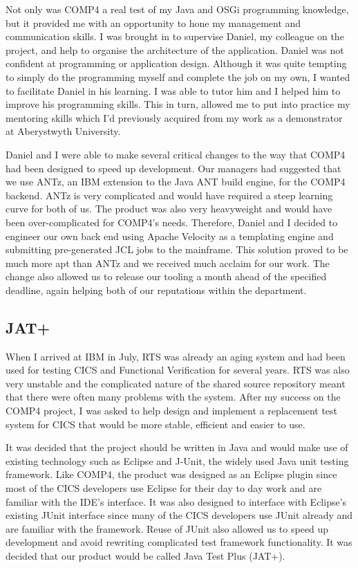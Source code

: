 \documentclass[12pt,a4paper]{article}
\begin{document}
Not only was COMP4 a real test of my Java and OSGi programming knowledge, but it
provided me with an opportunity to hone my management and communication skills.
I was brought in to supervise Daniel, my colleague on the project, and help to
organise the architecture of the application. Daniel was not confident at
programming or application design. Although it was quite tempting to simply do
the programming myself and complete the job on my own, I wanted to facilitate 
Daniel in his learning. I was able to tutor him and I
helped him to improve his programming skills. This in turn, allowed me to put into
practice my mentoring skills which I'd previously acquired from my work as a
demonstrator at Aberystwyth University.

Daniel and I were able to make several critical changes to the way that COMP4
had been designed to speed up development. Our managers had suggested that we
use ANTz, an IBM extension to the Java ANT build engine, for the COMP4 backend.
ANTz is very complicated and would have required a steep learning curve for both
of us. The product was also very heavyweight and would have been over-complicated
for COMP4's needs. Therefore, Daniel and I decided to engineer our own back end
using Apache Velocity as a templating engine and submitting pre-generated JCL
jobs to the mainframe. This solution proved to be much more apt than ANTz and we
received much acclaim for our work. The change also allowed us to release our
tooling a month ahead of the specified deadline, again helping both of our
reputations within the department.

\subsection{JAT+}
\label{sec:jatp}
When I arrived at IBM in July, RTS was already an aging system and had been used
for testing CICS and Functional Verification for several years. RTS was also
very unstable and the complicated nature of the shared source repository meant
that there were often many problems with the system. After my success on the
COMP4 project, I was asked to help design and implement a replacement test
system for CICS that would be more stable, efficient and easier to use. 

It was decided that the project should be written in Java and would make use of
existing technology such as Eclipse and J-Unit, the widely used Java unit
testing framework. Like COMP4, the product was designed as an Eclipse plugin
since most of the CICS developers use Eclipse for their day to day work and are
familiar with the IDE's interface. It was also designed to interface with
Eclipse's existing JUnit interface since many of the CICS developers use JUnit
already and are familiar with the framework. Reuse of JUnit also allowed us to
speed up development and avoid rewriting complicated test framework
functionality. It was decided that our product would be called Java Test Plus
(JAT+).
\end{document}

